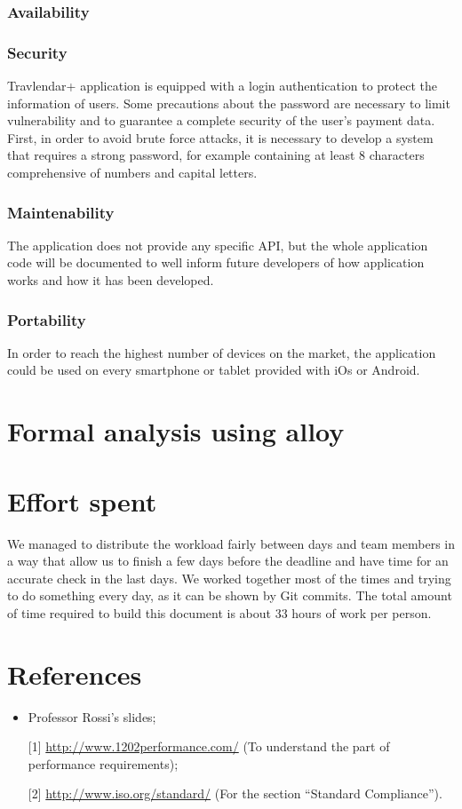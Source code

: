 \documentclass[12pt,titlepage]{article}
\begin{document}
\subsubsection{Availability}\label{sec:mod1}
\subsubsection{Security}\label{sec:mod1}

Travlendar+ application is equipped with a login authentication to protect the information of users. Some precautions about the password are necessary to limit vulnerability and to guarantee a complete security of the user's payment data. First, in order to avoid brute force attacks, it is necessary to develop a system that requires a strong password, for example containing at least 8 characters comprehensive of numbers and capital letters.



\subsubsection{Maintenability}\label{sec:mod1}
The application does not provide any specific API, but the whole application code will be documented to well inform future developers of how application works and how it has been developed. 

\subsubsection{Portability}\label{sec:mod1}
In order to reach the highest number of devices on the market, the application could be used on every smartphone or tablet provided with iOs or Android. 
\pagebreak
\section{Formal analysis using alloy}\label{sec:crit}
\pagebreak
\section{Effort spent}\label{sec:crit}
We managed to distribute the workload fairly between days and team members in a way that allow us to finish a few days before the deadline and have time for an accurate check in the last days.
We worked together most of the times and trying to do something every day, as it can be shown by Git commits.
The total amount of time required to build this document is about 33 hours of work per person.
\pagebreak

\section{References}\label{sec:crit}
\begin{itemize}
\item Professor Rossi's slides;
\item [{[1]}] \url{http://www.1202performance.com/} (To understand the part of performance requirements);
\item [{[2]}] \url{http://www.iso.org/standard/} (For the section ``Standard Compliance'').
\end{itemize}
\end{document}
